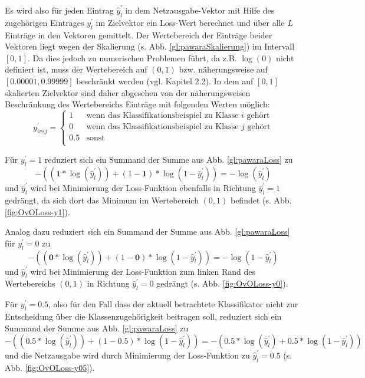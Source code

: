 Es wird also für jeden Eintrag $\widehat{y}_{l}^{'}$ in dem Netzausgabe-Vektor mit Hilfe des zugehörigen Eintrages $y_{l}^{'}$ im Zielvektor ein Loss-Wert berechnet und über alle $L$ Einträge in den Vektoren gemittelt. Der Wertebereich der Einträge beider Vektoren liegt wegen der Skalierung (s. Abb. \ref{gl:pawaraSkalierung}) im Intervall $[0,1]$. Da dies jedoch zu numerischen Problemen führt, da z.B. $\log{(0)}$ nicht definiert ist, muss der Wertebereich auf $(0, 1)$ bzw. näherungsweise auf $[0.00001, 0.99999]$ beschränkt werden (vgl. \cite{pawaraPaper} Kapitel 2.2).
In dem auf $[0, 1]$ skalierten Zielvektor sind daher abgesehen von der näherungsweisen Beschränkung des Wertebereichs Einträge mit folgenden Werten möglich:
\[
y_{ivsj}^{'}=
\begin{cases}
1 & \text{wenn das Klassifikationsbeispiel zu Klasse } i \text{ gehört}\\
0 & \text{wenn das Klassifikationsbeispiel zu Klasse } j \text{ gehört}\\
0.5 & \text{sonst}\\
\end{cases}
\]

Für $y_{l}^{'} = 1$ reduziert sich ein Summand der Summe aus Abb. \ref{gl:pawaraLoss} zu
\[-((\boldsymbol{1} * \log{(\widehat{y}_{l}^{'})}) + (1 - \boldsymbol{1}) * \log{(1-\widehat{y}_{l}^{'})}) = -\log{(\widehat{y}_{l}^{'})}\]
und $\widehat{y}_{l}^{'}$ wird bei Minimierung der Loss-Funktion ebenfalls in Richtung $\widehat{y}_{l}^{'}=1$ gedrängt, da sich dort das Minimum im Wertebereich $(0, 1)$ befindet (s. Abb. \ref{fig:OvOLoss-y1}).

Analog dazu reduziert sich ein Summand der Summe aus Abb. \ref{gl:pawaraLoss} für $y_{l}^{'} = 0$ zu
\[-((\boldsymbol{0} * \log{(\widehat{y}_{l}^{'})}) + (1 - \boldsymbol{0}) * \log{(1-\widehat{y}_{l}^{'})}) = -\log{(1-\widehat{y}_{l}^{'})}\]
und $\widehat{y}_{l}^{'}$ wird bei Minimierung der Loss-Funktion zum linken Rand des Wertebereichs $(0, 1)$ in Richtung $\widehat{y}_{l}^{'}=0$  gedrängt (s. Abb. \ref{fig:OvOLoss-y0}).

Für $y_{l}^{'} = 0.5$, also für den Fall dass der aktuell betrachtete Klassifikator nicht zur Entscheidung über die Klassenzugehörigkeit beitragen soll, reduziert sich ein Summand der Summe aus Abb. \ref{gl:pawaraLoss} zu
\[-((\boldsymbol{0.5} * \log{(\widehat{y}_{l}^{'})}) + (1 - \boldsymbol{0.5}) * \log{(1-\widehat{y}_{l}^{'})}) = - (0.5 * \log{(\widehat{y}_{l}^{'})} + 0.5 * \log{(1-\widehat{y}_{l}^{'})})\]
und die Netzausgabe wird durch Minimierung der Loss-Funktion zu $\widehat{y}_{l}^{'}=0.5$ (s. Abb. \ref{fig:OvOLoss-y05}).


